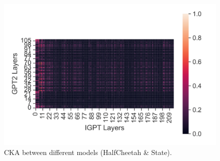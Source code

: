 \documentclass{article}
\begin{document}
\begin{figure}[H]
\begin{minipage}[b]{0.32\linewidth}
        \includegraphics[width=\linewidth]{figs/cka_40_40_gpt2igpt_halfcheetah_medium_666_state.png}
    \end{minipage}
    \caption{CKA between different models (HalfCheetah \& State).}
\end{figure}
\end{document}

